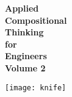 
\begin{center}

    \vspace{3cm}
    {\huge\bfseries Applied\\Compositional\\Thinking \\[3mm]for\\[1mm] Engineers\\[1cm]Volume 2}


\end{center}

\vspace{3cm}
\begin{center}
    \texttt{[image: knife]}
\end{center}


\vfill
